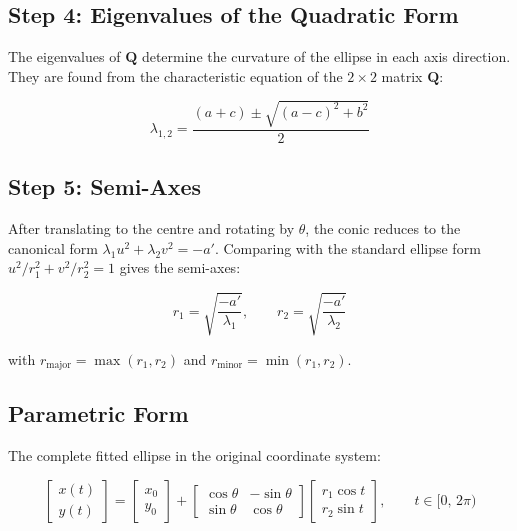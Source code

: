 \documentclass{article}
\begin{document}
	\subsection{Step 4: Eigenvalues of the Quadratic Form}
	
	The eigenvalues of $\mathbf{Q}$ determine the curvature of
	the ellipse in each axis direction.
	They are found from the characteristic equation of the
	$2\times2$ matrix $\mathbf{Q}$:
	
	\begin{equation}
		\lambda_{1,2} = \frac{(a + c) \pm \sqrt{(a-c)^2 + b^2}}{2}
		\label{eq:lambdas}
	\end{equation}
	
	\subsection{Step 5: Semi-Axes}
	
	After translating to the centre and rotating by $\theta$,
	the conic reduces to the canonical form
	$\lambda_1 u^2 + \lambda_2 v^2 = -a'$.
	Comparing with the standard ellipse form
	$u^2/r_1^2 + v^2/r_2^2 = 1$ gives the semi-axes:
	
	\begin{equation}
		r_1 = \sqrt{\frac{-a'}{\lambda_1}}, \qquad
		r_2 = \sqrt{\frac{-a'}{\lambda_2}}
		\label{eq:semiaxes}
	\end{equation}
	
	with $r_{\text{major}} = \max(r_1, r_2)$ and
	$r_{\text{minor}} = \min(r_1, r_2)$.
	
	\subsection{Parametric Form}
	
	The complete fitted ellipse in the original coordinate system:
	
	\begin{equation}
		\begin{bmatrix} x(t) \\ y(t) \end{bmatrix}
		=
		\begin{bmatrix} x_0 \\ y_0 \end{bmatrix}
		+
		\begin{bmatrix}
			\cos\theta & -\sin\theta \\
			\sin\theta &  \cos\theta
		\end{bmatrix}
		\begin{bmatrix} r_1 \cos t \\ r_2 \sin t \end{bmatrix},
		\qquad t \in [0,\, 2\pi)
	\end{equation}
	
\end{document}
